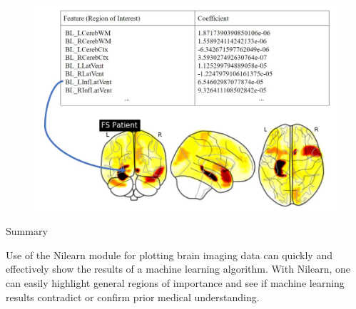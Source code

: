 \documentclass[final]{beamer}
\newlength{\onecolwid}
\begin{document}
\begin{frame}[t]
\begin{columns}[t]
\begin{column}{\onecolwid}
     \begin{figure}
        \includegraphics[width=1.0\linewidth]{images/mult.JPG}
    \end{figure}
    
    \begin{alertblock}{Summary}
    
        Use of the Nilearn module for plotting brain imaging data can quickly and effectively show the results of a machine learning algorithm. With Nilearn, one can easily highlight general regions of importance and see if machine learning results contradict or confirm prior medical understanding.
    
    \end{alertblock} 
    
        
        
        

\end{column}
\end{columns}
\end{frame}
\end{document}
